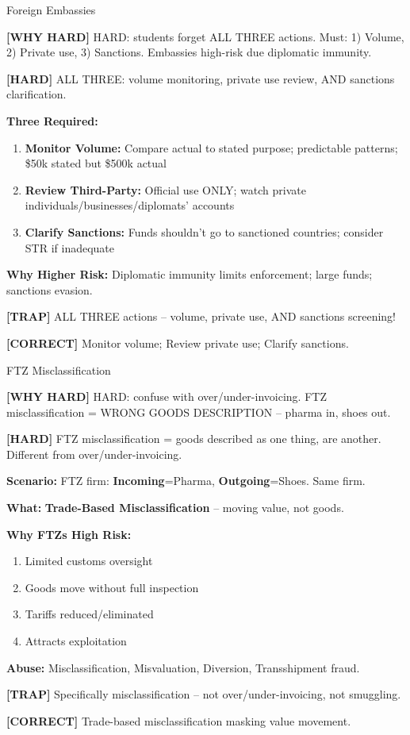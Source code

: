 \documentclass[6pt,aspectratio=169,fontsize=5pt]{beamer}
\renewcommand{\tiny}{\fontsize{3.5pt}{4.5pt}\selectfont}
\renewcommand{\normalsize}{\fontsize{7.5pt}{8.5pt}\selectfont}
\newcommand{\trap}[1]{%
	\begin{block}{\textcolor{redtrap}{\textbf{[TRAP]}}}
		\textcolor{redtrap}{\tiny #1}
	\end{block}
}
\newcommand{\correct}[1]{%
	\begin{block}{\textcolor{greencorrect}{\textbf{[CORRECT]}}}
		\textcolor{greencorrect}{\tiny #1}
	\end{block}
}
\newcommand{\hard}[1]{%
	\begin{block}{\textcolor{hardcolor}{\textbf{[HARD]}}}
		\textcolor{hardcolor}{\tiny #1}
	\end{block}
}
\newcommand{\hardexplain}[1]{%
	\begin{block}{\textcolor{orangehard}{\textbf{[WHY HARD]}}}
		\textcolor{orangehard}{\tiny #1}
	\end{block}
}
\begin{document}
	\begin{frame}{\normalsize Foreign Embassies}
		
		\hardexplain{HARD: students forget ALL THREE actions. Must: 1) Volume, 2) Private use, 3) Sanctions. Embassies high-risk due diplomatic immunity.}
		
		\hard{ALL THREE: volume monitoring, private use review, AND sanctions clarification.}
		
		\textbf{Three Required:}
		\begin{enumerate}
			\item \textbf{Monitor Volume:} Compare actual to stated purpose; predictable patterns; \$50k stated but \$500k actual
			\item \textbf{Review Third-Party:} Official use ONLY; watch private individuals/businesses/diplomats' accounts
			\item \textbf{Clarify Sanctions:} Funds shouldn't go to sanctioned countries; consider STR if inadequate
		\end{enumerate}
		
		\textbf{Why Higher Risk:} Diplomatic immunity limits enforcement; large funds; sanctions evasion.
		
		\trap{ALL THREE actions -- volume, private use, AND sanctions screening!}
		
		\correct{Monitor volume; Review private use; Clarify sanctions.}
	\end{frame}
	
	\begin{frame}{\normalsize FTZ Misclassification}
		
		\hardexplain{HARD: confuse with over/under-invoicing. FTZ misclassification = WRONG GOODS DESCRIPTION -- pharma in, shoes out.}
		
		\hard{FTZ misclassification = goods described as one thing, are another. Different from over/under-invoicing.}
		
		\textbf{Scenario:} FTZ firm: \textbf{Incoming}=Pharma, \textbf{Outgoing}=Shoes. Same firm.
		
		\textbf{What:} \textbf{Trade-Based Misclassification} -- moving value, not goods.
		
		\textbf{Why FTZs High Risk:}
		\begin{enumerate}
			\item Limited customs oversight
			\item Goods move without full inspection
			\item Tariffs reduced/eliminated
			\item Attracts exploitation
		\end{enumerate}
		
		\textbf{Abuse:} Misclassification, Misvaluation, Diversion, Transshipment fraud.
		
		\trap{Specifically misclassification -- not over/under-invoicing, not smuggling.}
		
		\correct{Trade-based misclassification masking value movement.}
	\end{frame}
	
\end{document}
